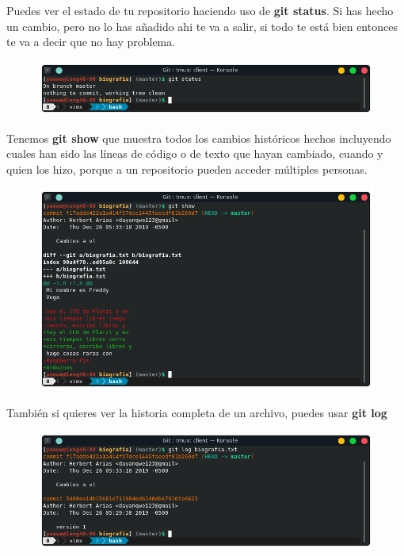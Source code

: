 \documentclass{article}
\begin{document}
Puedes ver el estado de tu repositorio haciendo uso de \textbf{git status}. Si
has hecho un cambio, pero no lo has añadido ahi te va a salir, si todo te está
bien entonces te va a decir que no hay problema.

\begin{figure}[h!]
  \centering
  \includegraphics[scale=0.75]{./Pictures/008_gitstatus.png}
\end{figure}

Tenemos \textbf{git show} que muestra todos los cambios históricos hechos
incluyendo cuales han sido las líneas de código o de texto que hayan cambiado,
cuando y quien los hizo, porque a un repositorio pueden acceder múltiples
personas.

\newpage

\begin{figure}[h!]
  \centering
  \includegraphics[scale=0.75]{./Pictures/009_gitshow.png}
\end{figure}

También si quieres ver la historia completa de un archivo, puedes usar
\textbf{git log}

\begin{figure}[h!]
  \centering
  \includegraphics[scale=0.75]{./Pictures/010_gitlog.png}
\end{figure}
\end{document}
